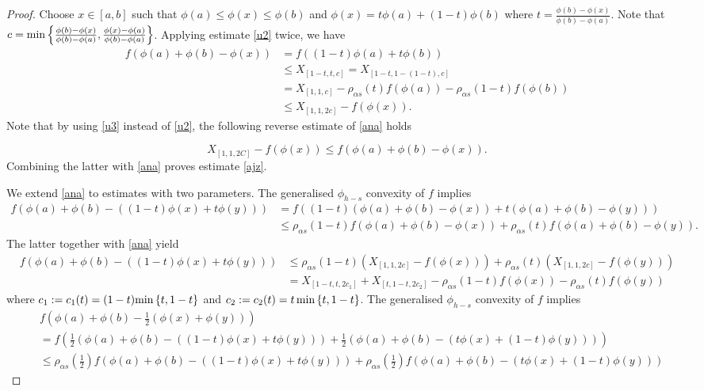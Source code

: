 \documentclass[10pt]{article}
\begin{document}
\begin{proof}
Choose $x\in[a,b]$ such that $\phi(a)\leq \phi(x)\leq \phi(b)$ and $\phi(x)=t\phi(a)+(1-t)\phi(b)$ where $t=\frac{\phi(b)-\phi(x)}{\phi(b)-\phi(a)}$. Note that $c=\textnormal{min}\left\{\frac{\phi(b)-\phi(x)}{\phi(b)-\phi(a)}, \frac{\phi(x)-\phi(a)}{\phi(b)-\phi(a)}   \right\}$. Applying estimate \eqref{u2} twice, we have
\begin{align}
f(\phi(a)+\phi(b)-\phi(x))&= f((1-t)\phi(a)+t\phi(b))              \nonumber
\\&\leq X_{[1-t,t,c]}= X_{[1-t,1-(1-t),c]}   \nonumber
\\& =X_{[1,1,c]} -\rho_{\alpha s}(t) f(\phi(a)) -\rho_{\alpha s} (1-t) f(\phi(b))   \nonumber
\\&\leq X_{[1,1,2c]} -f(\phi(x)). \label{ana}
\end{align}
Note that by using \eqref{u3} instead of \eqref{u2}, the following reverse estimate of \eqref{ana} holds

\[
X_{[1,1,2C]} -f(\phi(x)) \leq f(\phi(a)+\phi(b)-\phi(x)).
\]
Combining the latter with \eqref{ana} proves estimate \eqref{ajz}.

We extend \eqref{ana} to estimates with two parameters. The generalised $\phi_{h-s}$ convexity of $f$ implies
\begin{align}
f\left(  \phi(a) +\phi(b) -((1-t)\phi(x)+t\phi(y) )   \right) &= f\left((1-t)(\phi(a)+\phi(b) -\phi(x) )   +t(\phi(a)+\phi(b)-\phi(y) )   \right)   \nonumber
\\&\leq \rho_{\alpha s}(1-t) f(\phi(a)+\phi(b) -\phi(x))   +  \rho_{\alpha s}(t) f(\phi(a)+\phi(b) -\phi(y)) .  \nonumber
\end{align}
The latter together with \eqref{ana} yield
\begin{align}
f\left(  \phi(a) +\phi(b) -((1-t)\phi(x)+t\phi(y) )   \right) & \leq \rho_{\alpha s}(1-t) \left( X_{[1,1,2c]}-f(\phi(x))\right)   +  \rho_{\alpha s}(t) \left( X_{[1,1,2c]}-f(\phi(y))\right) \nonumber
\\&= X_{[1-t,t,2c_1]} +X_{[t,1-t,2c_2]} -  \rho_{\alpha s}(1-t) f(\phi(x))     -  \rho_{\alpha s}(t) f(\phi(y))      \label{y6}
\end{align}
where $c_1:=c_1(t)=(1-t)\textnormal{min}\left\{t, 1-t   \right\}$ and $c_2:=c_2(t)=t\,\textnormal{min}\left\{t, 1-t   \right\} $.
\vskip3mm
\noindent
The generalised $\phi_{h-s}$ convexity of $f$ implies
\begin{align}
&f\left( \phi(a) +\phi(b) -\frac{1}{2}(\phi(x)+\phi(y) )  \right)  \nonumber
\\&= f\left(\frac{1}{2}(\phi(a)+\phi(b) -((1-t)\phi(x) +t\phi(y) ) ) +\frac{1}{2}(\phi(a)+\phi(b) -(t\phi(x) +(1-t)\phi(y) ) )    \right)  \nonumber
\\&\leq \rho_{\alpha s}\left( \frac{1}{2} \right)f\left( \phi(a)+\phi(b) -((1-t)\phi(x) +t\phi(y) )  \right) +\rho_{\alpha s}\left( \frac{1}{2} \right)f\left( \phi(a)+\phi(b) -(t\phi(x) +(1-t)\phi(y) )  \right)  \nonumber
\end{align}


\end{proof}
\end{document}
